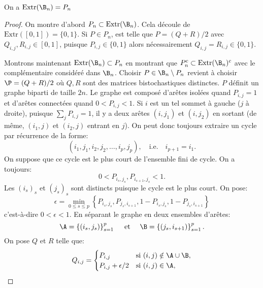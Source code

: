 \documentclass[info, math, french]{mpb-cours}
\begin{document}
\begin{thm}
	On a $\mathrm{Extr}(\B_{n}) = P_{n}$
\end{thm}
\begin{proof}
	On montre d'abord $P_n \subset \mathrm{Extr}(\B_n)$.
	Cela découle de $\text{Extr}([0,1]) = \{0,1\}$.
	Si $P \in P_n$, est telle que $P=(Q+R)/2$ avec $Q_{i,j},R_{i,j} \in [0,1]$, puisque $P_{i,j} \in \{0,1\}$ alors nécessairement $Q_{i,j}=R_{i,j} \in \{0,1\}$.

	Montrons maintenant $\text{Extr}(\B_n) \subset P_n$ en montrant que
	$P_n^c \subset \text{Extr}(\B_n)^c$ avec le complémentaire considéré dans $\B_n$.
	Choisir $P \in \B_n \setminus P_n$ revient à choisir $\P = (Q+R)/2$ où $Q,R$ sont des matrices
	bistochastiques distinctes.
	$P$ définit un graphe biparti de taille $2n$.
	Le graphe est composé d'arêtes isolées quand $P_{i,j}=1$ et d'arêtes connectées quand $0 < P_{i,j} <1$.
	Si $i$ est un tel sommet à gauche ($j$ à droite), puisque $\sum_j P_{i,j}=1$, il y a deux arêtes $(i,j_1)$ et $(i,j_2)$ en sortant (de même, $(i_1,j)$ et $(i_2,j)$ entrant en $j$).
	On peut donc toujours extraire un cycle par récurrence de la forme:
	\begin{equation*}
		\left(i_1,j_1,i_2,j_2,\ldots,i_p,j_p\right),
		\quad \text{i.e.}\quad i_{p+1}=i_1.
	\end{equation*}
	On suppose que ce cycle est le plus court de l'ensemble fini de cycle. On a toujours:
	\begin{equation*}
		0 < P_{i_s,j_s}, P_{i_{s+1},j_s} < 1.
	\end{equation*}
	Les $(i_s)_s$ et $(j_s)_s$ sont distincts puisque le cycle est le plus court. On pose:
	\begin{equation*}
		\epsilon = \min_{0 \leq s \leq p} \left\{ P_{i_s,j_s}, P_{j_s,i_{s+1}}, 1-P_{i_s,j_s}, 1-P_{j_s,i_{s+1}} \right\}
	\end{equation*}
	c'est-à-dire $0 < \epsilon < 1$.
	En séparant le graphe en deux ensembles d'arêtes:
	\begin{equation*}
		\A = \left\{(i_s,j_s)\right\}_{s=1}^p
		\quad \text{ et } \quad
		\B = \left\{(j_s,i_{s+1})\right\}_{s=1}^p.
	\end{equation*}
	On pose $Q$ et $R$ telle que:
	\begin{equation*}
		Q_{i,j} =
		\begin{cases}
			P_{i,j}            & \text{si } (i,j) \notin \A \cup \B, \\
			P_{i,j}+\epsilon/2 & \text{si } (i,j) \in \A,            \\

\end{cases}
\end{equation*}
\end{proof}
\end{document}
